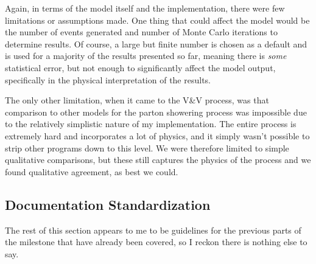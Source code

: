 Again, in terms of the model itself and the implementation, there were few limitations or assumptions made. One  thing that could affect the model would be the number of events generated and number of Monte Carlo iterations to determine results. Of course, a large but finite number is chosen as a default and is used for a majority of the results presented so far, meaning there is \textit{some} statistical error, but not enough to significantly affect the model output, specifically in the physical interpretation of the results.

The only other limitation, when it came to the V\&V process, was that comparison to other models for the parton showering process was impossible due to the relatively simplistic nature of my implementation. The entire process is extremely hard and incorporates a lot of physics, and it simply wasn't possible to strip other programs down to this level. We were therefore limited to simple qualitative comparisons, but these still captures the physics of the process and we found qualitative agreement, as best we could.


\subsection{Documentation Standardization}

The rest of this section appears to me to be guidelines for the previous parts of the milestone that have already been covered, so I reckon there is nothing else to say.


